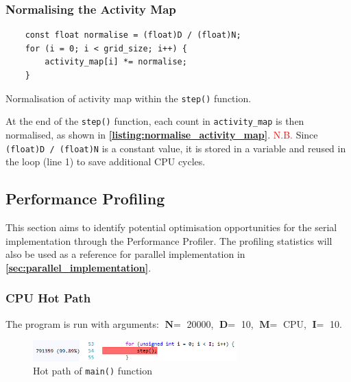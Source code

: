 \documentclass[12pt, a4paper]{article}
\let\oldcref\cref
\renewcommand{\cref}[1]{\textbf{\oldcref{#1}}}
\begin{document}
\subsubsection{Normalising the Activity Map} \label{subsec:normalise_activity_map}
\begin{listing}[H]
  \begin{verbatim}
    const float normalise = (float)D / (float)N;
    for (i = 0; i < grid_size; i++) {
        activity_map[i] *= normalise;
    }
  \end{verbatim}
  \caption{Normalisation of activity map within the \texttt{step()} function.}
  \label{listing:normalise_activity_map}
\end{listing}

At the end of the \texttt{step()} function, each count in \texttt{activity\_map} is then normalised,
as shown in \cref{listing:normalise_activity_map}. \textcolor{red}{N.B.} Since
\texttt{(float)D / (float)N} is a constant value, it is stored in a variable and reused in
the loop (line 1) to save additional CPU cycles.

\subsection{Performance Profiling}
This section aims to identify potential optimisation opportunities for the serial implementation
through the Performance Profiler. The profiling statistics will also be used as a reference for
parallel implementation in \cref{sec:parallel_implementation}.

\subsubsection{CPU Hot Path} \label{subsec:cpu_hotpath}
The program is run with arguments: $\textbf{N} =$ 20000, $\textbf{D} =$ 10, $\textbf{M} =$ CPU, $\textbf{I} =$ 10.
\begin{figure}[H]
  \centering
  \includegraphics[width=0.7\textwidth]{images/hotpath_main.png}
  \caption{Hot path of \texttt{main()} function}
  \label{fig:hotpath_main}
\end{figure}
\end{document}
